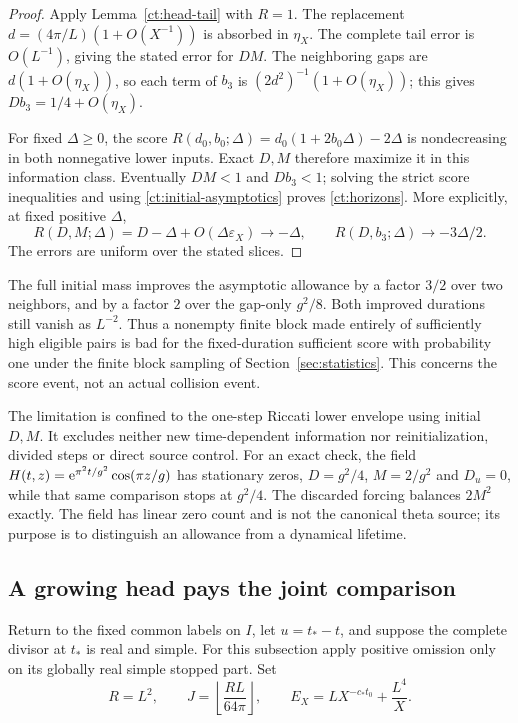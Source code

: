 \begin{proof}
Apply Lemma~\ref{ct:head-tail} with $R=1$. The replacement
$d=(4\pi/L)(1+O(X^{-1}))$ is absorbed in $\eta_X$.
The complete tail error is $O(L^{-1})$, giving the stated error for
$DM$. The neighboring gaps are $d(1+O(\eta_X))$, so each term
of $b_3$ is $(2d^2)^{-1}(1+O(\eta_X))$; this gives
$Db_3=1/4+O(\eta_X)$.

For fixed $\Delta\ge0$, the score
$R(d_0,b_0;\Delta)=d_0(1+2b_0\Delta)-2\Delta$ is nondecreasing
in both nonnegative lower inputs. Exact $D,M$ therefore maximize it
in this information class. Eventually $DM<1$ and $Db_3<1$;
solving the strict score inequalities and using
\eqref{ct:initial-asymptotics} proves \eqref{ct:horizons}. More
explicitly, at fixed positive $\Delta$,
\begin{equation}
 R(D,M;\Delta)=D-\Delta+O(\Delta\varepsilon_X)\longrightarrow-\Delta,
 \qquad
 R(D,b_3;\Delta)\longrightarrow-3\Delta/2.
 \label{ct:score-limits}
\end{equation}
The errors are uniform over the stated slices.
\end{proof}

The full initial mass improves the asymptotic allowance by a factor
$3/2$ over two neighbors, and by a factor $2$ over the gap-only
$g^2/8$. Both improved durations still vanish as $L^{-2}$. Thus a
nonempty finite block made entirely of sufficiently high eligible pairs
is bad for the fixed-duration sufficient score with probability one
under the finite block sampling of Section~\ref{sec:statistics}.
This concerns the score event, not an actual collision event.

The limitation is confined to the one-step Riccati lower envelope using
initial $D,M$. It excludes neither new time-dependent information nor
reinitialization, divided steps or direct source control. For an exact
check, the field
$H(t,z)=\mathrm e^{\pi^2t/g^2}\cos(\pi z/g)$ has stationary zeros,
$D=g^2/4$, $M=2/g^2$ and $D_u=0$, while that same comparison stops
at $g^2/4$. The discarded forcing balances $2M^2$ exactly. The field
has linear zero count and is not the canonical theta source; its purpose
is to distinguish an allowance from a dynamical lifetime.

\subsection{A growing head pays the joint comparison}

Return to the fixed common labels on $I$, let $u=t_*-t$, and suppose
the complete divisor at $t_*$ is real and simple. For this subsection
apply positive omission only on its globally real simple stopped part.
Set
\begin{equation}
 R=L^2,\qquad
 J=\left\lfloor\frac{RL}{64\pi}\right\rfloor,\qquad
 E_X=LX^{-c_*t_0}+\frac{L^4}{X}.
 \label{ct:growing-head}
\end{equation}

